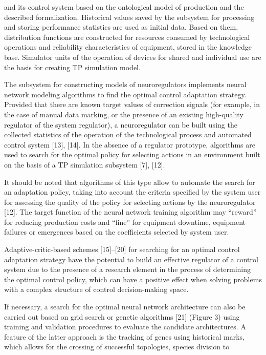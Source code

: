 \documentclass{article}
\begin{document}
\begin{multicols}{2}
and its control system based on the ontological model
of production and the described formalization. Historical
values saved by the subsystem for processing and storing
performance statistics are used as initial data. Based on
them, distribution functions are constructed for resources
consumed by technological operations and reliability
characteristics of equipment, stored in the knowledge
base. Simulator units of the operation of devices for
shared and individual use are the basis for creating TP
simulation model.\par
The subsystem for constructing models of neuroregulators implements neural network modeling algorithms
to find the optimal control adaptation strategy. Provided
that there are known target values of correction signals
(for example, in the case of manual data marking, or
the presence of an existing high-quality regulator of the
system regulator), a neuroregulator can be built using the
collected statistics of the operation of the technological
process and automated control system [13], [14]. In the
absence of a regulator prototype, algorithms are used
to search for the optimal policy for selecting actions in
an environment built on the basis of a TP simulation
subsystem [7], [12].\par
It should be noted that algorithms of this type allow
to automate the search for an adaptation policy, taking
into account the criteria specified by the system user
for assessing the quality of the policy for selecting
actions by the neuroregulator [12]. The target function
of the neural network training algorithm may “reward”
for reducing production costs and “fine” for equipment
downtime, equipment failures or emergences based on
the coefficients selected by system user.\par
Adaptive-critic-based schemes [15]–[20] for searching
for an optimal control adaptation strategy have the potential to build an effective regulator of a control system due
to the presence of a research element in the process of
determining the optimal control policy, which can have
a positive effect when solving problems with a complex
structure of control decision-making space.\par
If necessary, a search for the optimal neural network
architecture can also be carried out based on grid search
or genetic algorithms [21] (Figure 3) using training and
validation procedures to evaluate the candidate architectures. A feature of the latter approach is the tracking
of genes using historical marks, which allows for the
crossing of successful topologies, species division to

\end{multicols}
\end{document}
